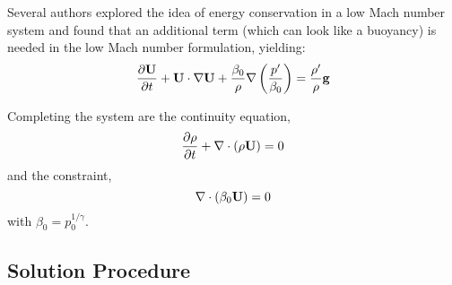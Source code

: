 Several authors \cite{KP:2012,VLBWZ:2013} explored the idea of energy
conservation in a low Mach number system and found that an additional term (which can
look like a buoyancy) is needed in the low Mach number formulation, yielding:
\begin{equation}
\frac{\partial {\bf U}}{\partial t} + {\bf U} \cdot \nabla {\bf U} + 
   \frac{\beta_0}{\rho} \nabla \left (\frac{p^\prime}{\beta_0} \right ) = 
   \frac{\rho^\prime}{\rho} {\bf g}
\end{equation}

Completing the system are the continuity equation,
\begin{equation}
\frac{\partial \rho}{\partial t} + \nabla \cdot (\rho {\bf U}) = 0
\end{equation}
and the constraint,
\begin{equation}
\nabla \cdot (\beta_0 {\bf U}) = 0
\end{equation}
with $\beta_0 = p_0^{1/\gamma}$.

  
\subsection{Solution Procedure}

\label{sec:lm:density}

